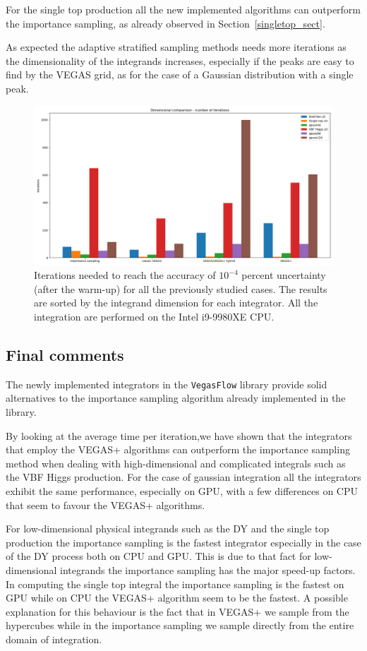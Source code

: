 \documentclass[../main/main.tex]{subfiles}
\begin{document}
For the single top production all the new implemented algorithms can outperform the importance sampling, as already observed in Section~\ref{singletop_sect}.

As expected the adaptive stratified sampling methods needs more iterations as the dimensionality of the integrands increases, especially if the peaks are easy to find by the VEGAS grid, as for the case of a Gaussian distribution with a single peak.
\begin{figure}[h]
	\centering
	\includegraphics[width=\textwidth]{../images/iter_final.png}
	\caption{Iterations needed to reach the accuracy of $10^{-4}$ percent uncertainty (after the warm-up) for all the previously studied cases. The results are sorted by the integrand dimension for each integrator. All the integration are performed on the Intel i9-9980XE CPU. }
	\label{cpu_iter_comparison}
\end{figure}

\subsection{Final comments}
The newly implemented integrators in the \texttt{VegasFlow} library provide solid alternatives to the importance sampling algorithm already implemented in the library.

By looking at the average time per iteration,we have shown that the integrators that employ the VEGAS+ algorithms can outperform the importance sampling method when dealing with high-dimensional and complicated integrals such as the VBF Higgs production.
For the case of gaussian integration all the integrators exhibit the same performance, especially on GPU, with a few differences on CPU that seem to favour the VEGAS+ algorithms.

For low-dimensional physical integrands such as the DY and the single top production the importance sampling is the fastest integrator especially in the case of the DY process both on CPU and GPU. This is due to that fact for low-dimensional integrands the importance sampling has the major speed-up factors.
In computing the single top integral the importance sampling is the fastest on GPU while on CPU the VEGAS+ algorithm seem to be the fastest. A possible explanation for this behaviour is the fact that in VEGAS+ we sample from the hypercubes while in the importance sampling we sample directly from the entire domain of integration.
\end{document}
